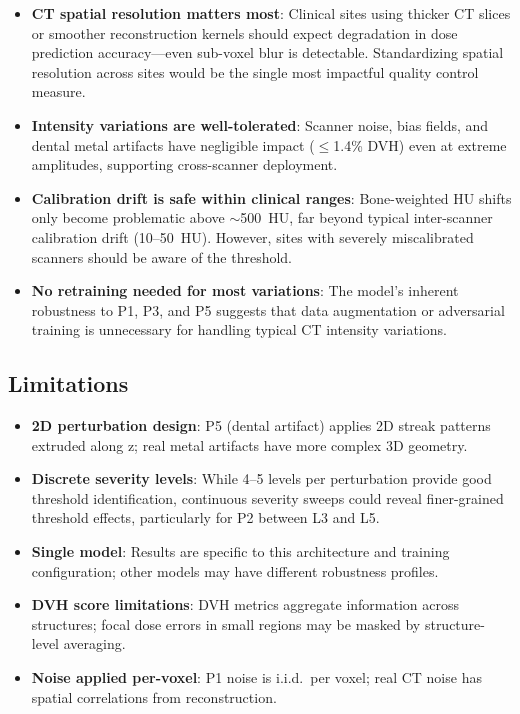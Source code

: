 \documentclass[11pt,a4paper]{article}
\begin{document}
\begin{itemize}
    \item \textbf{CT spatial resolution matters most}: Clinical sites using thicker CT slices or smoother reconstruction kernels should expect degradation in dose prediction accuracy---even sub-voxel blur is detectable. Standardizing spatial resolution across sites would be the single most impactful quality control measure.
    \item \textbf{Intensity variations are well-tolerated}: Scanner noise, bias fields, and dental metal artifacts have negligible impact ($\leq$1.4\% DVH) even at extreme amplitudes, supporting cross-scanner deployment.
    \item \textbf{Calibration drift is safe within clinical ranges}: Bone-weighted HU shifts only become problematic above $\sim$500~HU, far beyond typical inter-scanner calibration drift (10--50~HU). However, sites with severely miscalibrated scanners should be aware of the threshold.
    \item \textbf{No retraining needed for most variations}: The model's inherent robustness to P1, P3, and P5 suggests that data augmentation or adversarial training is unnecessary for handling typical CT intensity variations.
\end{itemize}

\subsection{Limitations}

\begin{itemize}
    \item \textbf{2D perturbation design}: P5 (dental artifact) applies 2D streak patterns extruded along z; real metal artifacts have more complex 3D geometry.
    \item \textbf{Discrete severity levels}: While 4--5 levels per perturbation provide good threshold identification, continuous severity sweeps could reveal finer-grained threshold effects, particularly for P2 between L3 and L5.
    \item \textbf{Single model}: Results are specific to this architecture and training configuration; other models may have different robustness profiles.
    \item \textbf{DVH score limitations}: DVH metrics aggregate information across structures; focal dose errors in small regions may be masked by structure-level averaging.
    \item \textbf{Noise applied per-voxel}: P1 noise is i.i.d.\ per voxel; real CT noise has spatial correlations from reconstruction.
\end{itemize}
\end{document}
